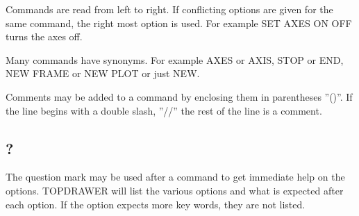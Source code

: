 Commands  are  read from left to right.  If conflicting options are given
for the same command,  the  right  most  option  is  used.   For  example
SET AXES ON OFF turns the axes off.  

Many  commands have synonyms.  For example AXES or AXIS, STOP or END, NEW
FRAME or NEW PLOT or just NEW.  

Comments may be added to a command by enclosing them in parentheses ''()''.
If the line begins with a double slash, ''//'' the rest of the  line  is  a
comment.  
\subsection{?}
The  question  mark  may be used after a command to get immediate help on
the options.  TOPDRAWER  will  list  the  various  options  and  what  is
expected  after  each option.  If the option expects more key words, they
are not listed.  
